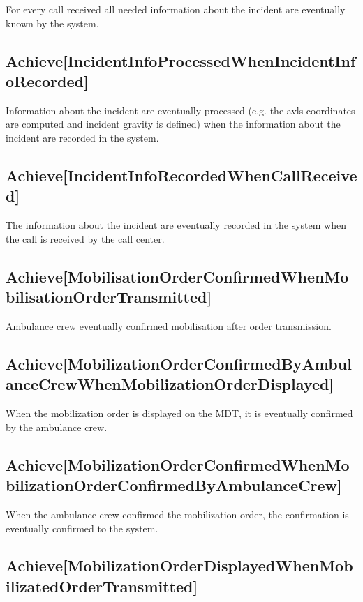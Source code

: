 For every call received all needed information about the incident are eventually known by the system.


\subsection{Achieve[IncidentInfoProcessedWhenIncidentInfoRecorded]}

Information about the incident are eventually processed (e.g. the avls coordinates are computed and incident gravity is defined) when the information about the incident are recorded in the system.


\subsection{Achieve[IncidentInfoRecordedWhenCallReceived]}

The information about the incident are eventually recorded in the system when the call is received by the call center.


\subsection{Achieve[MobilisationOrderConfirmedWhenMobilisationOrderTransmitted]}

Ambulance crew eventually confirmed mobilisation after order transmission.


\subsection{Achieve[MobilizationOrderConfirmedByAmbulanceCrewWhenMobilizationOrderDisplayed]}

When the mobilization order is displayed on the MDT, it is eventually confirmed by the ambulance crew.
 

\subsection{Achieve[MobilizationOrderConfirmedWhenMobilizationOrderConfirmedByAmbulanceCrew]}

When the ambulance crew confirmed the mobilization order, the confirmation is eventually confirmed to the system. 


\subsection{Achieve[MobilizationOrderDisplayedWhenMobilizatedOrderTransmitted]}

